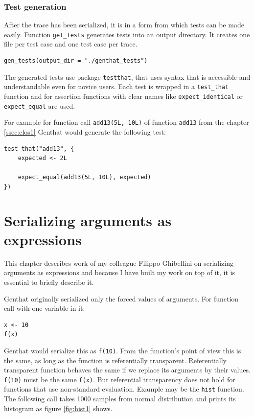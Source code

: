 \documentclass[thesis=B,english]{FITthesis}[2012/10/20]
\begin{document}
\subsection{Test generation}
After the trace has been serialized, it is in a form from which tests can be made easily. Function \verb|get_tests| generates tests into an output directory. It creates one file per test case and one test case per trace. 

\begin{verbatim}
gen_tests(output_dir = "./genthat_tests")
\end{verbatim}

The generated tests use package \verb|testthat|\cite{testthat}, that uses syntax that is accessible and understandable even for novice users. Each test is wrapped in a \verb|test_that| function and for assertion functions with clear names like \verb|expect_identical| or \verb|expect_equal| are used.

For example for function call \verb|add13(5L, 10L)| of function \verb|add13| from the chapter \ref{ssec:clos1} Genthat would generate the following test:

\begin{verbatim}
test_that("add13", {
    expected <- 2L

    expect_equal(add13(5L, 10L), expected)
})
\end{verbatim}

\chapter{Serializing arguments as expressions} \label{chap:args}
This chapter describes work of my colleague Filippo Ghibellini on serializing arguments as expressions and because I have built my work on top of it, it is essential to briefly describe it.

Genthat originally serialized only the forced values of arguments. For function call with one variable in it:

\begin{verbatim}
x <- 10
f(x)
\end{verbatim}

Genthat would serialize this as \verb|f(10)|. From the function’s point of view this is the same, as long as the function is referentially transparent. Referentially transparent function behaves the same if we replace its arguments by their values. \verb|f(10)| must be the same \verb|f(x)|. But referential transparency does not hold for functions that use non-standard evaluation. Example may be the \verb|hist| function. The following call takes 1000 samples from normal distribution and prints its histogram as figure \ref{fig:hist1} shows.
\end{document}

